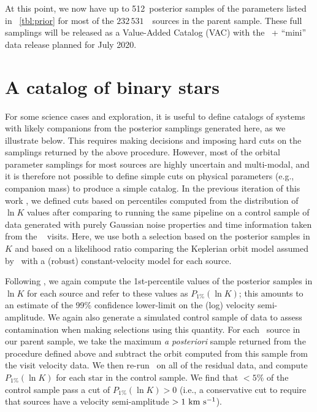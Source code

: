 \documentclass[modern]{aastex63}
\newcommand{\nsources}{\ensuremath{232\,531}}
\newcommand{\Kminval}{512}
\begin{document}
At this point, we now have up to \Kminval\ posterior samples of the parameters
listed in \tablename~\ref{tbl:prior} for most of the \nsources\ \apogee\ sources
in the parent sample.
These full samplings will be released as a Value-Added Catalog (VAC) with the
\sdss\ + ``mini'' data release planned for July 2020.


\section{A catalog of binary stars} \label{sec:catalog}

For some science cases and exploration, it is useful to define catalogs of
systems with likely companions from the posterior samplings generated here, as
we illustrate below.
This requires making decisions and imposing hard cuts on the samplings returned
by the above procedure.
However, most of the orbital parameter samplings for most sources are highly
uncertain and multi-modal, and it is therefore not possible to define simple
cuts on physical parameters (e.g., companion mass) to produce a simple catalog.
In the previous iteration of this work \citep{Price-Whelan:2018}, we defined
cuts based on percentiles computed from the distribution of $\ln K$ values after
comparing to running the same pipeline on a control sample of data generated
with purely Gaussian noise properties and time information taken from the
\apogee\  visits.
Here, we use both a selection based on the posterior samples in $K$ and based on
a likelihood ratio comparing the Keplerian orbit model assumed by \thejoker\
with a (robust) constant-velocity model for each source.

Following \citet{Price-Whelan:2018}, we again compute the 1st-percentile values
of the posterior samples in $\ln K$ for each source and refer to these values as
$P_{1\%}(\ln K)$;
this amounts to an estimate of the 99\% confidence lower-limit on the (log)
velocity semi-amplitude.
We again also generate a simulated control sample of data to assess
contamination when making selections using this quantity.
For each \apogee\ source in our parent sample, we take the maximum \textsl{a
posteriori} sample returned from the procedure defined above and subtract the
orbit computed from this sample from the visit velocity data.
We then re-run \thejoker\ on all of the residual data, and compute $P_{1\%}(\ln
K)$ for each star in the control sample.
We find that $<5\%$ of the control sample pass a cut of $P_{1\%}(\ln K) > 0$
(i.e., a conservative cut to require that sources have a velocity semi-amplitude
$> 1~\mathrm{km}~\mathrm{s}^{-1}$).
\end{document}
